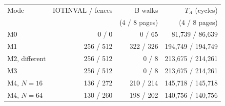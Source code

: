 \begin{tabular}{lrrr}
\toprule
Mode & IOTINVAL / fences & B walks & $T_A$ (cycles) \\
 & & (4 / 8 pages) & (4 / 8 pages) \\
\midrule
M0 & 0 / 0 & 0 / 65 & 81,739 / 86,639 \\
M1 & 256 / 512 & 322 / 326 & 194,749 / 194,749 \\
M2, different & 256 / 512 & 0 / 8 & 213,675 / 214,261 \\
M3 & 256 / 512 & 0 / 8 & 213,675 / 214,261 \\
M4, $N=16$ & 136 / 272 & 210 / 214 & 145,718 / 145,718 \\
M4, $N=64$ & 130 / 260 & 198 / 202 & 140,756 / 140,756 \\
\bottomrule
\end{tabular}
